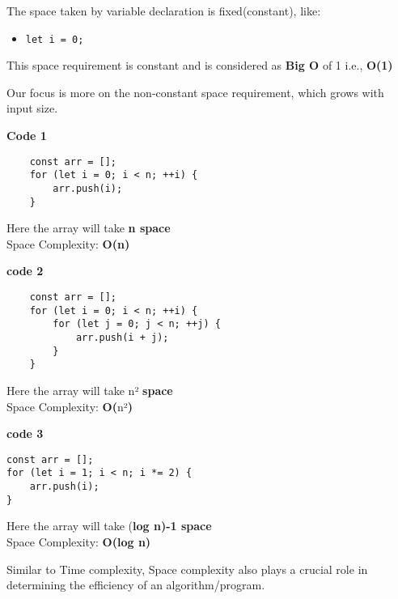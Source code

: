 \hypertarget{c33c}{\label{c33c}}

\hypertarget{ad79}{\label{ad79}}

The space taken by variable declaration is fixed(constant), like:

\begin{itemize}
	\tightlist
	\item
	      \protect\hypertarget{a1c1}{}{\texttt{let\ i\ =\ 0;}}
\end{itemize}

This space requirement is constant and is considered as \textbf{Big O}
of 1 i.e., \textbf{O(1)}

Our focus is more on the non-constant space requirement, which grows with input size.

\hypertarget{845a}{\label{845a}}

\textbf{Code 1}

\begin{verbatim}
	const arr = [];
	for (let i = 0; i < n; ++i) {
		arr.push(i);
	}
\end{verbatim}

Here the array will take \textbf{n space}\\
Space Complexity: \textbf{O(n)}

\textbf{code 2}

\begin{verbatim}
	const arr = [];
	for (let i = 0; i < n; ++i) {
		for (let j = 0; j < n; ++j) {
			arr.push(i + j);
		}
	}
\end{verbatim}

Here the array will take n² \textbf{space}\\
Space Complexity: \textbf{O(}n²\textbf{)}

\textbf{code 3}

\begin{verbatim}
const arr = [];
for (let i = 1; i < n; i *= 2) {
    arr.push(i);
}
\end{verbatim}

Here the array will take (\textbf{log n)-1 space}\\
Space Complexity: \textbf{O(log n)}

\hypertarget{94f8}{\label{94f8}}

Similar to Time complexity, Space complexity also plays a crucial role
in determining the efficiency of an algorithm/program.

